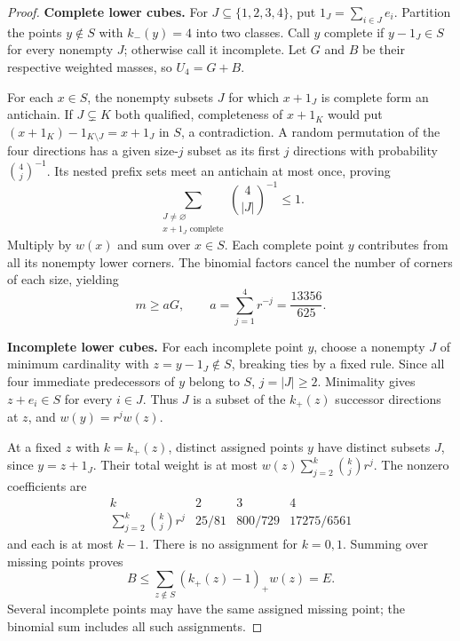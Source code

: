 \begin{proof}
\medskip\noindent\textbf{Complete lower cubes.}
For $J\subseteq\{1,2,3,4\}$, put $1_J=\sum_{i\in J}e_i$.
Partition the points $y\notin S$ with $k_-(y)=4$ into two classes.
Call $y$ complete if $y-1_J\in S$ for every nonempty $J$; otherwise
call it incomplete. Let $G$ and $B$ be their respective weighted
masses, so $U_4=G+B$.

For each $x\in S$, the nonempty subsets $J$ for which $x+1_J$ is
complete form an antichain. If $J\subsetneq K$ both qualified,
completeness of $x+1_K$ would put
$(x+1_K)-1_{K\setminus J}=x+1_J$ in $S$, a contradiction.
A random permutation of the four directions has a given size-$j$
subset as its first $j$ directions with probability $\binom4j^{-1}$.
Its nested prefix sets meet an antichain at most once, proving
\[
 \sum_{\substack{J\ne\varnothing\\x+1_J\text{ complete}}}
          \binom4{|J|}^{-1}\le1.
\]
Multiply by $w(x)$ and sum over $x\in S$. Each complete point $y$
contributes from all its nonempty lower corners. The binomial factors
cancel the number of corners of each size, yielding
\begin{equation}\label{eq:five-profile-complete-cubes}
 m\ge aG,\qquad a=\sum_{j=1}^4r^{-j}=\frac{13356}{625}.
\end{equation}

\medskip\noindent\textbf{Incomplete lower cubes.}
For each incomplete point $y$, choose a nonempty $J$ of minimum
cardinality with $z=y-1_J\notin S$, breaking ties by a fixed rule.
Since all four immediate predecessors of $y$ belong to $S$,
$j=|J|\ge2$. Minimality gives $z+e_i\in S$ for every $i\in J$.
Thus $J$ is a subset of the $k_+(z)$ successor directions at $z$,
and $w(y)=r^jw(z)$.

At a fixed $z$ with $k=k_+(z)$, distinct assigned points $y$ have
distinct subsets $J$, since $y=z+1_J$. Their total weight is at most
$w(z)\sum_{j=2}^k\binom kjr^j$. The nonzero coefficients are
\[
\begin{array}{c|ccc}
 k&2&3&4\\ \hline
 \displaystyle\sum_{j=2}^k\binom kjr^j
       &25/81&800/729&17275/6561
\end{array}
\]
and each is at most $k-1$. There is no assignment for $k=0,1$.
Summing over missing points proves
\begin{equation}\label{eq:five-profile-incomplete-cubes}
 B\le\sum_{z\notin S}(k_+(z)-1)_+w(z)=E.
\end{equation}
Several incomplete points may have the same assigned missing point;
the binomial sum includes all such assignments.


\end{proof}
